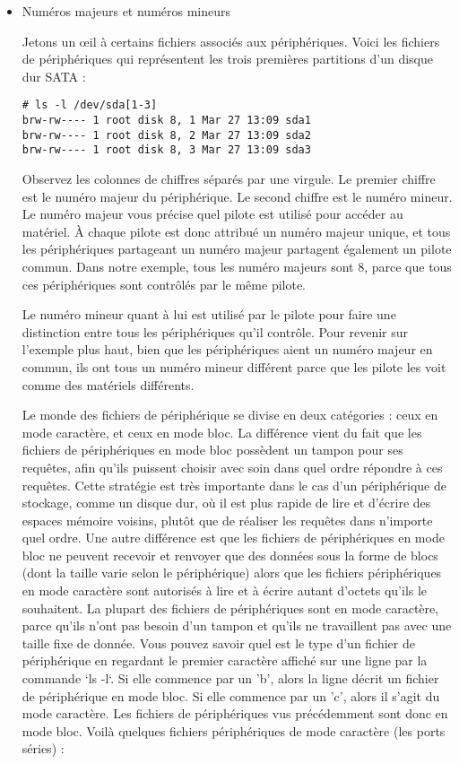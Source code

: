 \documentclass[11pt]{article}
\begin{document}
\begin{itemize}
\item Numéros majeurs et numéros mineurs
\label{sec-5-6-0-1}

Jetons un œil à certains fichiers associés aux périphériques.
Voici les fichiers de périphériques qui représentent les trois premières partitions d'un disque dur SATA :

\begin{verbatim}
# ls -l /dev/sda[1-3]
brw-rw---- 1 root disk 8, 1 Mar 27 13:09 sda1
brw-rw---- 1 root disk 8, 2 Mar 27 13:09 sda2
brw-rw---- 1 root disk 8, 3 Mar 27 13:09 sda3
\end{verbatim}

Observez les colonnes de chiffres séparés par une virgule. Le premier chiffre est le numéro majeur du périphérique. Le second chiffre est le numéro mineur. Le numéro majeur vous précise quel pilote est utilisé pour accéder au matériel. À chaque pilote est donc attribué un numéro majeur unique, et tous les périphériques partageant un numéro majeur partagent également un pilote commun. Dans notre exemple, tous les numéro majeurs sont 8, parce que tous ces périphériques sont contrôlés par le même pilote.

Le numéro mineur quant à lui est utilisé par le pilote pour faire une distinction entre tous les périphériques qu'il contrôle. Pour revenir sur l'exemple plus haut, bien que les périphériques aient un numéro majeur en commun, ils ont tous un numéro mineur différent parce que les pilote les voit comme des matériels différents.

Le monde des fichiers de périphérique se divise en deux catégories : ceux en mode caractère, et ceux en mode bloc. La différence vient du fait que les fichiers de périphériques en mode bloc possèdent un tampon pour ses requêtes, afin qu'ils puissent choisir avec soin dans quel ordre répondre à ces requêtes. Cette stratégie est très importante dans le cas d'un périphérique de stockage, comme un disque dur, où il est plus rapide de lire et d'écrire des espaces mémoire voisins, plutôt que de réaliser les requêtes dans n'importe quel ordre. Une autre différence est que les fichiers de périphériques en mode bloc ne peuvent recevoir et renvoyer que des données sous la forme de blocs (dont la taille varie selon le périphérique) alors que les fichiers périphériques en mode caractère sont autorisés à lire et à écrire autant d'octets qu'ils le souhaitent. La plupart des fichiers de périphériques sont en mode caractère, parce qu'ils n'ont pas besoin d'un tampon et qu'ils ne travaillent pas avec une taille fixe de donnée. Vous pouvez savoir quel est le type d'un fichier de périphérique en regardant le premier caractère affiché sur une ligne par la commande `ls -l`. Si elle commence par un 'b', alors la ligne décrit un fichier de périphérique en mode bloc. Si elle commence par un 'c', alors il s'agit du mode caractère. Les fichiers de périphériques vus précédemment sont donc en mode bloc. Voilà quelques fichiers périphériques de mode caractère (les ports séries) :


\end{itemize}
\end{document}
